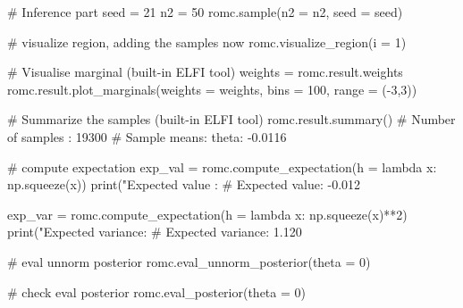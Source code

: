 \begin{Code}
# Inference part
seed = 21
n2 = 50
romc.sample(n2 = n2, seed = seed)

# visualize region, adding the samples now
romc.visualize_region(i = 1)

# Visualise marginal (built-in ELFI tool)
weights = romc.result.weights
romc.result.plot_marginals(weights = weights, bins = 100, range = (-3,3))

# Summarize the samples (built-in ELFI tool)
romc.result.summary()
# Number of samples  : 19300
# Sample means: theta: -0.0116

# compute expectation
exp_val = romc.compute_expectation(h = lambda x: np.squeeze(x))
print("Expected value   : %
# Expected value: -0.012

exp_var = romc.compute_expectation(h = lambda x: np.squeeze(x)**2)
print("Expected variance: %
# Expected variance: 1.120

# eval unnorm posterior
romc.eval_unnorm_posterior(theta = 0)

# check eval posterior
romc.eval_posterior(theta = 0)
\end{Code}

